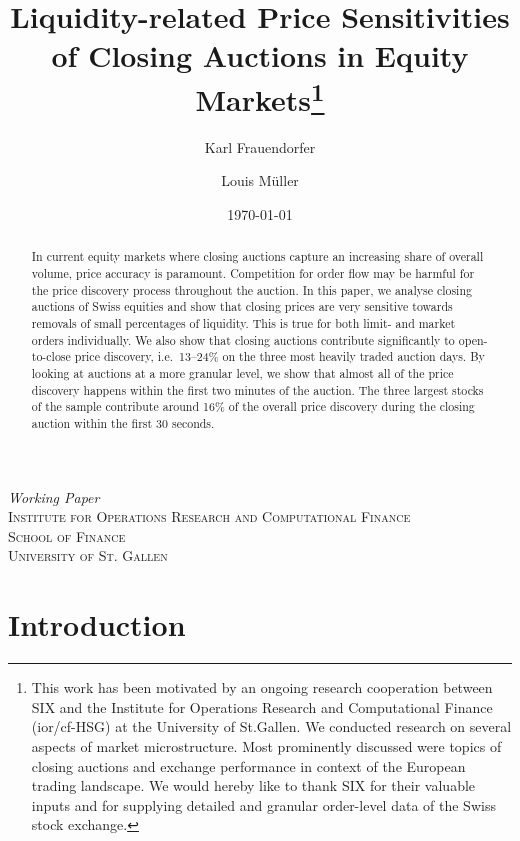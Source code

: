 \documentclass[11pt,a4paper, notitlepage]{article}
\title{Liquidity-related Price Sensitivities of Closing Auctions in Equity Markets\thanks{This work has been motivated by an ongoing research cooperation between \acf{SIX} and the Institute for Operations Research and Computational Finance (ior/cf-HSG) at the University of St.Gallen. We conducted research on several aspects of market microstructure. Most prominently discussed were topics of closing auctions and exchange performance in context of the European trading landscape. We would hereby like to thank SIX for their valuable inputs and for supplying detailed and granular order-level data of the Swiss stock exchange.}}
\author{Karl Frauendorfer
\and Louis Müller
}
\date{\today}
\begin{document}
	
	\begin{titlepage}
		
		\centering
		
		
		\maketitle

		\emph{Working Paper} \\
		
		\vspace{1.5cm}
		\textsc{ \normalsize Institute for Operations Research and Computational Finance \\ School of Finance \\ University of St. Gallen }
		
		
		\vfill
		
		\begin{abstract}
			In current equity markets where closing auctions capture an increasing share of overall volume, price accuracy is paramount. Competition for order flow may be harmful for the price discovery process throughout the auction. In this paper, we analyse closing auctions of Swiss equities and show that closing prices are very sensitive towards removals of small percentages of liquidity. This is true for both limit- and market orders individually. We also show that closing auctions contribute significantly to open-to-close price discovery, i.e.\ 13--24\% on the three most heavily traded auction days. By looking at auctions at a more granular level, we show that almost all of the price discovery happens within the first two minutes of the auction. The three largest stocks of the sample contribute around 16\% of the overall price discovery during the closing auction within the first 30 seconds.
		\end{abstract}


%			
		
		\thispagestyle{empty}
	\end{titlepage}

%
	\clearpage
	
	
	\section{Introduction} \label{sec:introduction}
	
\end{document}
